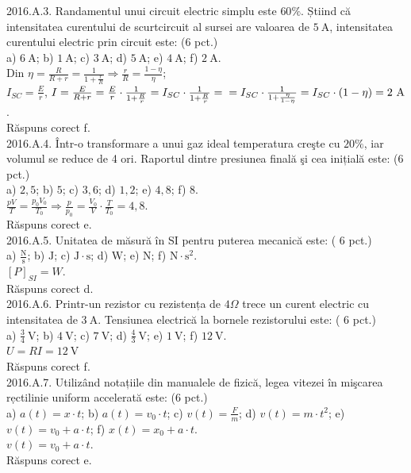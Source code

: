 2016.A.3. Randamentul unui circuit electric simplu este $60 \%$. Știind că intensitatea curentului de scurtcircuit al sursei are valoarea de $5 \mathrm{~A}$, intensitatea curentului electric prin circuit este: (6 pct.)\\ a) $6 \mathrm{~A}$; b) $1 \mathrm{~A}$; c) $3 \mathrm{~A}$; d) $5 \mathrm{~A}$; e) $4 \mathrm{~A}$; f) $2 \mathrm{~A}$.\\ Din $\eta=\frac{R}{R+r}=\frac{1}{1+\frac{r}{R}} \Rightarrow \frac{r}{R}=\frac{1-\eta}{\eta}$;\\ $I_{S C}=\frac{E}{r}$, $I=\frac{E}{R+r}=\frac{E}{r} \cdot \frac{1}{1+\frac{R}{r}}=I_{S C} \cdot \frac{1}{1+\frac{R}{r}}= \\ =I_{S C} \cdot \frac{1}{1+\frac{\eta}{1-\eta}}=I_{S C} \cdot(1-\eta)=2 \mathrm{~A}$.\\ Răspuns corect f.\\

2016.A.4. Într-o transformare a unui gaz ideal temperatura creşte cu $20 \%$, iar volumul se reduce de 4 ori. Raportul dintre presiunea finală şi cea inițială este: (6 pct.)\\ a) $2,5$; b) $5$; c) $3,6$; d) $1,2$; e) $4,8$; f) $8$.\\ $\frac{p V}{T}=\frac{p_{0} V_{0}}{T_{0}} \Rightarrow \frac{p}{p_{0}}=\frac{V_{0}}{V} \cdot \frac{T}{T_{0}}=4,8$.\\ Răspuns corect e.\\

2016.A.5. Unitatea de măsură în SI pentru puterea mecanică este: ( 6 pct.)\\ a) $\frac{\mathrm{N}}{\mathrm{s}}$; b) $\mathrm{J}$; c) $\mathrm{J} \cdot \mathrm{s}$; d) $\mathrm{W}$; e) $\mathrm{N}$; f) $\mathrm{N} \cdot \mathrm{s}^{2}$.\\ $[P]_{S I}=W$.\\ Răspuns corect d.\\

2016.A.6. Printr-un rezistor cu rezistența de $4 \Omega$ trece un curent electric cu intensitatea de $3 \mathrm{~A}$. Tensiunea electrică la bornele rezistorului este: ( 6 pct.)\\ a) $\frac{3}{4} \mathrm{~V}$; b) $4 \mathrm{~V}$; c) $7 \mathrm{~V}$; d) $\frac{4}{3} \mathrm{~V}$; e) $1 \mathrm{~V}$; f) $12 \mathrm{~V}$.\\ $U=R I=12 \mathrm{~V}$\\ Răspuns corect f.\\

2016.A.7. Utilizând notațiile din manualele de fizică, legea vitezei în mişcarea rẹctilinie uniform accelerată este: (6 pct.)\\ a) $a(t)=x \cdot t$; b) $a(t)=v_{0} \cdot t$; c) $v(t)=\frac{F}{m}$; d) $v(t)=m \cdot t^{2}$; e) $v(t)=v_{0}+a \cdot t$; f) $x(t)=x_{0}+a \cdot t$.\\ $v(t)=v_{0}+a \cdot t$.\\ Răspuns corect e.\\

